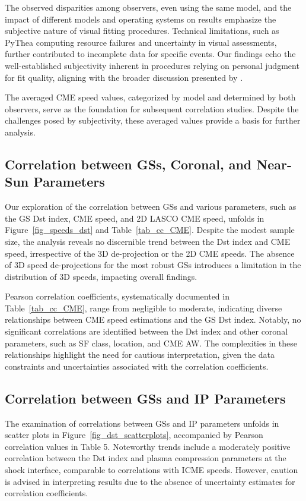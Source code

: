 The observed disparities among observers, even using the same model, and the impact of different models and operating systems on results emphasize the subjective nature of visual fitting procedures. Technical limitations, such as PyThea computing resource failures and uncertainty in visual assessments, further contributed to incomplete data for specific events. Our findings echo the well-established subjectivity inherent in procedures relying on personal judgment for fit quality, aligning with the broader discussion presented by \citet{verbeke_2022}.

The averaged CME speed values, categorized by model and determined by both observers, serve as the foundation for subsequent correlation studies. Despite the challenges posed by subjectivity, these averaged values provide a basis for further analysis.

\subsection{Correlation between GSs, Coronal, and Near-Sun Parameters}
Our exploration of the correlation between GSs and various parameters, such as the GS Dst index, CME speed, and 2D LASCO CME speed, unfolds in Figure~\ref{fig_speeds_dst} and Table~\ref{tab_cc_CME}. Despite the modest sample size, the analysis reveals no discernible trend between the Dst index and CME speed, irrespective of the 3D de-projection or the 2D CME speeds. The absence of 3D speed de-projections for the most robust GSs introduces a limitation in the distribution of 3D speeds, impacting overall findings.

Pearson correlation coefficients, systematically documented in Table~\ref{tab_cc_CME}, range from negligible to moderate, indicating diverse relationships between CME speed estimations and the GS Dst index. Notably, no significant correlations are identified between the Dst index and other coronal parameters, such as SF class, location, and CME AW. The complexities in these relationships highlight the need for cautious interpretation, given the data constraints and uncertainties associated with the correlation coefficients.

\subsection{Correlation between GSs and IP Parameters}
The examination of correlations between GSs and IP parameters unfolds in scatter plots in Figure~\ref{fig_dst_scatterplots}, accompanied by Pearson correlation values in Table 5. Noteworthy trends include a moderately positive correlation between the Dst index and plasma compression parameters at the shock interface, comparable to correlations with ICME speeds. However, caution is advised in interpreting results due to the absence of uncertainty estimates for correlation coefficients.

